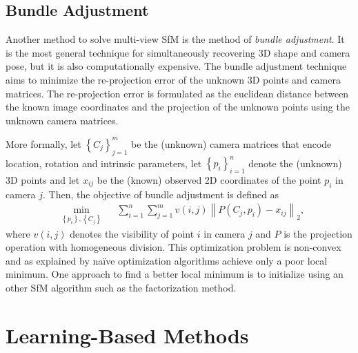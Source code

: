	\subsection{Bundle Adjustment} 
		Another method to solve multi-view SfM is the method of \emph{bundle adjustment}.
		It is the most general technique for simultaneously recovering 3D shape and camera pose, but it is also computationally expensive.
		The bundle adjustment technique aims to minimize the re-projection error of the unknown 3D points and camera matrices.
		The re-projection error is formulated as the euclidean distance between the known image coordinates and the projection of the unknown points using the unknown camera matrices.
		
		More formally, let 
			$\left \lbrace C_j \right \rbrace_{j = 1}^{m}$ 
		be the (unknown) camera matrices that encode location, rotation and intrinsic parameters, let 
			$\left \lbrace p_i \right \rbrace_{i = 1}^{n}$ 
		denote the (unknown) 3D points and let $x_{ij}$ be the (known) observed 2D coordinates of the point $p_i$ in camera $j$.
		Then, the objective of bundle adjustment is defined as
		\begin{equation}\label{eq:bundle_adjustment}
			\begin{aligned}
				& \underset{\left\lbrace p_i \right\rbrace, \left\lbrace C_j \right\rbrace}{\text{min}}
				& & \sum_{i = 1}^{n} \sum_{j = 1}^{m} v(i, j) \left\| P(C_j, p_i) - x_{ij} \right\|_2 ,
			\end{aligned}
		\end{equation}
		where $v(i, j)$ denotes the visibility of point $i$ in camera $j$ and $P$ is the projection operation with homogeneous division.
		This optimization problem is non-convex and as explained by \cite{survey2017} na\"ive optimization algorithms achieve only a poor local minimum.
		One approach to find a better local minimum is to initialize using an other SfM algorithm such as the factorization method.
		
	
	\section{Learning-Based Methods}
	\label{sec:learning_based_methods}
	
